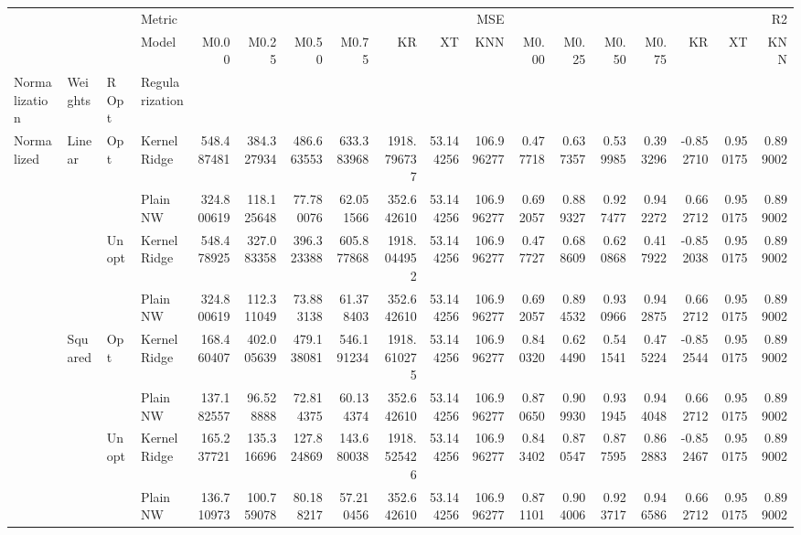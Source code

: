 \begin{tabular}{llllrrrrrrrrrrrrrr}
\toprule
 &  &  & Metric & \multicolumn{7}{r}{MSE} & \multicolumn{7}{r}{R2} \\
 &  &  & Model & M0.00 & M0.25 & M0.50 & M0.75 & KR & XT & KNN & M0.00 & M0.25 & M0.50 & M0.75 & KR & XT & KNN \\
Normalization & Weights & R Opt & Regularization &  &  &  &  &  &  &  &  &  &  &  &  &  &  \\
\midrule
\multirow[t]{8}{*}{Normalized} & \multirow[t]{4}{*}{Linear} & \multirow[t]{2}{*}{Opt} & KernelRidge & 548.487481 & 384.327934 & 486.663553 & 633.383968 & 1918.796737 & 53.144256 & 106.996277 & 0.477718 & 0.637357 & 0.539985 & 0.393296 & -0.852710 & 0.950175 & 0.899002 \\
 &  &  & Plain NW & 324.800619 & 118.125648 & 77.780076 & 62.051566 & 352.642610 & 53.144256 & 106.996277 & 0.692057 & 0.889327 & 0.927477 & 0.942272 & 0.662712 & 0.950175 & 0.899002 \\
\cline{3-18}
 &  & \multirow[t]{2}{*}{Unopt} & KernelRidge & 548.478925 & 327.083358 & 396.323388 & 605.877868 & 1918.044952 & 53.144256 & 106.996277 & 0.477727 & 0.688609 & 0.620868 & 0.417922 & -0.852038 & 0.950175 & 0.899002 \\
 &  &  & Plain NW & 324.800619 & 112.311049 & 73.883138 & 61.378403 & 352.642610 & 53.144256 & 106.996277 & 0.692057 & 0.894532 & 0.930966 & 0.942875 & 0.662712 & 0.950175 & 0.899002 \\
\cline{2-18} \cline{3-18}
 & \multirow[t]{4}{*}{Squared} & \multirow[t]{2}{*}{Opt} & KernelRidge & 168.460407 & 402.005639 & 479.138081 & 546.191234 & 1918.610275 & 53.144256 & 106.996277 & 0.840320 & 0.624490 & 0.541541 & 0.475224 & -0.852544 & 0.950175 & 0.899002 \\
 &  &  & Plain NW & 137.182557 & 96.528888 & 72.814375 & 60.134374 & 352.642610 & 53.144256 & 106.996277 & 0.870650 & 0.909930 & 0.931945 & 0.944048 & 0.662712 & 0.950175 & 0.899002 \\
\cline{3-18}
 &  & \multirow[t]{2}{*}{Unopt} & KernelRidge & 165.237721 & 135.316696 & 127.824869 & 143.680038 & 1918.525426 & 53.144256 & 106.996277 & 0.843402 & 0.870547 & 0.877595 & 0.862883 & -0.852467 & 0.950175 & 0.899002 \\
 &  &  & Plain NW & 136.710973 & 100.759078 & 80.188217 & 57.210456 & 352.642610 & 53.144256 & 106.996277 & 0.871101 & 0.904006 & 0.923717 & 0.946586 & 0.662712 & 0.950175 & 0.899002 \\
\cline{1-18} \cline{2-18} \cline{3-18}
\bottomrule
\end{tabular}
